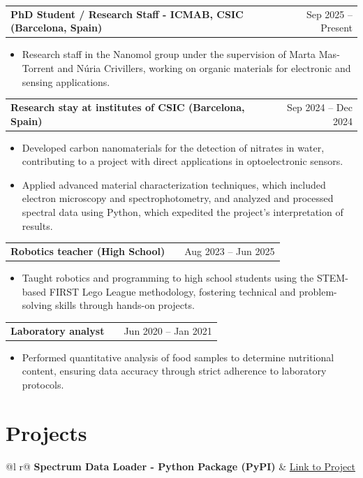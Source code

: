\documentclass[a4paper,12pt]{article}
\makeatletter
\newenvironment{joblong}[2]
    {
    \begin{tabularx}{\linewidth}{@{}l X r@{}}
    \textbf{#1} & \hfill &  #2 \\[3.75pt]
    \end{tabularx}
    \begin{minipage}[t]{\linewidth}
    \begin{itemize}[nosep,after=\strut, leftmargin=1em, itemsep=3pt,label=--]
    }
    {
    \end{itemize}
    \end{minipage}    
    }
\makeatother
\begin{document}
\begin{joblong}{PhD Student / Research Staff - ICMAB, CSIC (Barcelona, Spain)}{Sep 2025 -- Present}
\item	Research staff in the Nanomol group under the supervision of Marta Mas-Torrent and Núria Crivillers, working on organic materials for electronic and sensing applications.
\end{joblong}

\begin{joblong}{Research stay at institutes of CSIC (Barcelona, Spain)}{Sep 2024 -- Dec 2024}
\item	Developed carbon nanomaterials for the detection of nitrates in water, contributing to a project with direct applications in optoelectronic sensors.
\item	Applied advanced material characterization techniques, which included electron microscopy and spectrophotometry, and analyzed and processed spectral data using Python, which expedited the project's interpretation of results.
\end{joblong}

\begin{joblong}{Robotics teacher (High School)}{Aug 2023 -- Jun 2025}
\item	Taught robotics and programming to high school students using the STEM-based FIRST Lego League methodology, fostering technical and problem-solving skills through hands-on projects.
\end{joblong}

\begin{joblong}{Laboratory analyst}{Jun 2020 -- Jan 2021}
\item Performed quantitative analysis of food samples to determine nutritional content, ensuring data accuracy through strict adherence to laboratory protocols.
\end{joblong}

\section{Projects}

\begin{tabularx}{\linewidth}{ @{}l r@{} }
\textbf{Spectrum Data Loader - Python Package (PyPI)} & \hfill \href{https://pypi.org/project/spectrum-data-loader/0.1.0/}{Link to Project} \\[3.75pt]
  \\
\end{tabularx}
  
\end{document}
